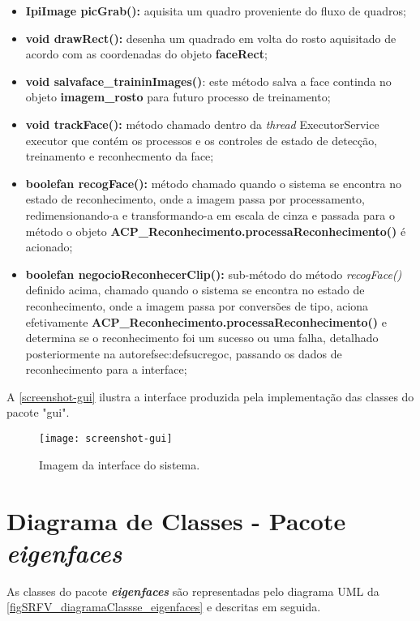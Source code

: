 \begin{itemize}
\begin{itemize}
		\item \textbf{IpiImage picGrab():} aquisita um quadro proveniente do fluxo de quadros;
		
		\item \textbf{void drawRect():} desenha um quadrado em volta do rosto aquisitado de acordo com as coordenadas do objeto \textbf{faceRect};
		
		\item \textbf{void salvaface\_traininImages()}: este método salva a face continda no objeto \textbf{imagem\_rosto} para futuro processo de treinamento;
		
		\item \textbf{void trackFace():} método chamado dentro da \textit{thread} ExecutorService executor que contém os processos e os controles de estado de detecção, treinamento e reconhecmento da face;
		
		\item \textbf{boolefan recogFace():} método chamado quando o sistema se encontra no estado de reconhecimento, onde a imagem passa por processamento, redimensionando-a e transformando-a em escala de cinza e passada para o método o objeto \textbf{ACP\_Reconhecimento.processaReconhecimento()} é acionado;
		
		\item \textbf{boolefan negocioReconhecerClip():} sub-método do método \textit{recogFace()} definido acima, chamado quando o sistema se encontra no estado de reconhecimento, onde a imagem passa por conversões de tipo,  aciona efetivamente \textbf{ACP\_Reconhecimento.processaReconhecimento()} e determina se o reconhecimento foi um sucesso ou uma falha, detalhado posteriormente na autoref{sec:defsucregoc}, passando os dados de reconhecimento para a interface;
	\end{itemize}
\end{itemize}


A \autoref{screenshot-gui} ilustra a interface produzida pela implementação das classes do pacote "gui".

\begin{figure}[h]
	\centering
	\texttt{[image: screenshot-gui]}
	\caption{Imagem da interface do sistema.}
	\label{screenshot-gui}
\end{figure}



\section{Diagrama de Classes - Pacote \textit{\textbf{eigenfaces}}}\label{sec:eigenfacesclass}
As classes do pacote \textbf{\textit{eigenfaces}} são representadas pelo diagrama UML da \autoref{figSRFV_diagramaClassse_eigenfaces} e descritas em seguida. 

